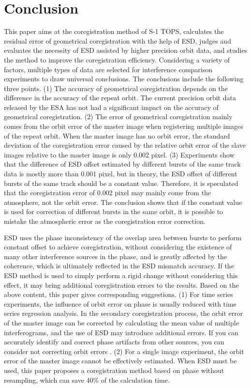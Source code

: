 \documentclass[preprint, authoryear]{elsarticle}
\begin{document}
\section{Conclusion}
This paper aims at the coregistration method of S-1 TOPS, calculates the residual error of geometrical coregistration with the help of ESD, judges and evaluates the necessity of ESD assisted by higher precision orbit data, and studies the method to improve the coregistration efficiency. Considering a variety of factors, multiple types of data are selected for interference comparison experiments to draw universal conclusions. The conclusions include the following three points. (1) The accuracy of geometrical coregistration depends on the difference in the accuracy of the repeat orbit. The current precision orbit data released by the ESA has not had a significant impact on the accuracy of geometrical coregistration. (2) The error of geometrical coregistration mainly comes from the orbit error of the master image when registering multiple images of the repeat orbit. When the master image has no orbit error, the standard deviation of the coregistration error caused by the relative orbit error of the slave images relative to the master image is only 0.002 pixel. (3) Experiments show that the difference of ESD offset estimated by different bursts of the same track data is mostly more than 0.001 pixel, but in theory, the ESD offset of different bursts of the same track should be a constant value. Therefore, it is speculated that the coregistration error of 0.002 pixel may mainly come from the atmosphere, not the orbit error. The conclusion shows that if the constant value is used for correction of different bursts in the same orbit, it is possible to mistake the atmospheric error as the coregistration error correction. \par
ESD uses the phase inconsistency of the overlap area between bursts to perform constant offset to achieve coregistration, without considering the existence of many other interference sources in the phase, and is greatly affected by the coherence, which is ultimately reflected in the ESD mismatch accuracy. If the ESD method is used to simply perform a rigid change without considering this effect, it may bring additional coregistration errors to the results. Based on the above content, this paper gives corresponding suggestions. (1) For time series experiments, the influence of orbit error on phase is usually reduced with time series regression analysis. In the secondary coregistration process, the orbit error of the master image can be corrected by calculating the mean value of multiple interferograms, and the use of ESD may introduce additional errors. If you can accurately identify and correct phase artifacts from other sources, you can consider not correcting orbit errors \cite{InSAR_uncertainty_due_to_orbital_errors}. (2) For a single image experiment, the orbit error of the master image cannot be effectively estimated. When ESD must be used, this paper proposes a coregistration method based on phase without resampling, which can save 40\% of the calculation time. \par
\end{document}
